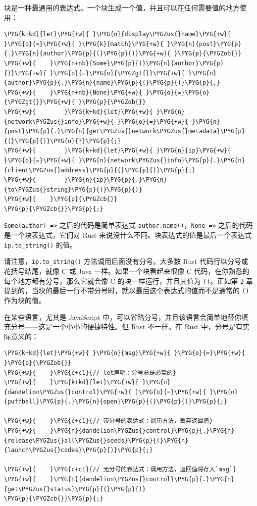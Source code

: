 块是一种最通用的表达式。一个块生成一个值，并且可以在任何需要值的地方使用：

\begin{Verbatim}[commandchars=\\\{\},breaklines=true,breakanywhere=true,fontsize=\codefont,xleftmargin=17bp]
\PYG{k+kd}{let}\PYG{+w}{ }\PYG{n}{display\PYGZus{}name}\PYG{+w}{ }\PYG{o}{=}\PYG{+w}{ }\PYG{k}{match}\PYG{+w}{ }\PYG{n}{post}\PYG{p}{.}\PYG{n}{author}\PYG{p}{(}\PYG{p}{)}\PYG{+w}{ }\PYG{p}{\PYGZob{}}
\PYG{+w}{    }\PYG{n+nb}{Some}\PYG{p}{(}\PYG{n}{author}\PYG{p}{)}\PYG{+w}{ }\PYG{o}{=}\PYG{o}{\PYGZgt{}}\PYG{+w}{ }\PYG{n}{author}\PYG{p}{.}\PYG{n}{name}\PYG{p}{(}\PYG{p}{)}\PYG{p}{,}
\PYG{+w}{    }\PYG{n+nb}{None}\PYG{+w}{ }\PYG{o}{=}\PYG{o}{\PYGZgt{}}\PYG{+w}{ }\PYG{p}{\PYGZob{}}
\PYG{+w}{        }\PYG{k+kd}{let}\PYG{+w}{ }\PYG{n}{network\PYGZus{}info}\PYG{+w}{ }\PYG{o}{=}\PYG{+w}{ }\PYG{n}{post}\PYG{p}{.}\PYG{n}{get\PYGZus{}network\PYGZus{}metadata}\PYG{p}{(}\PYG{p}{)}\PYG{o}{?}\PYG{p}{;}
\PYG{+w}{        }\PYG{k+kd}{let}\PYG{+w}{ }\PYG{n}{ip}\PYG{+w}{ }\PYG{o}{=}\PYG{+w}{ }\PYG{n}{network\PYGZus{}info}\PYG{p}{.}\PYG{n}{client\PYGZus{}address}\PYG{p}{(}\PYG{p}{)}\PYG{p}{;}
\PYG{+w}{        }\PYG{n}{ip}\PYG{p}{.}\PYG{n}{to\PYGZus{}string}\PYG{p}{(}\PYG{p}{)}
\PYG{+w}{    }\PYG{p}{\PYGZcb{}}
\PYG{p}{\PYGZcb{}}\PYG{p}{;}
\end{Verbatim}

\texttt{Some(author) =>} 之后的代码是简单表达式 \texttt{author.name()}，\texttt{None =>} 之后的代码是一个块表达式，它们对 Rust 来说没什么不同。块表达式的值是最后一个表达式 \texttt{ip.to\_string()} 的值。

请注意，\texttt{ip.to\_string()} 方法调用后面没有分号。大多数 Rust 代码行以分号或花括号结尾，就像 C 或 Java 一样。如果一个块看起来很像 C 代码，在你熟悉的每个地方都有分号，那么它就会像 C 的块一样运行，并且其值为 \texttt{()}。正如第 2 章提到的，当块的最后一行不带分号时，就以最后这个表达式的值而不是通常的 \texttt{()} 作为块的值。

在某些语言，尤其是 JavaScript 中，可以省略分号，并且该语言会简单地替你填充分号——这是一个小小的便捷特性。但 Rust 不一样。在 Rust 中，分号是有实际意义的：

\begin{Verbatim}[commandchars=\\\{\},breaklines=true,breakanywhere=true,fontsize=\codefont,xleftmargin=17bp]
\PYG{k+kd}{let}\PYG{+w}{ }\PYG{n}{msg}\PYG{+w}{ }\PYG{o}{=}\PYG{+w}{ }\PYG{p}{\PYGZob{}}
\PYG{+w}{    }\PYG{c+c1}{// let声明：分号总是必需的}
\PYG{+w}{    }\PYG{k+kd}{let}\PYG{+w}{ }\PYG{n}{dandelion\PYGZus{}control}\PYG{+w}{ }\PYG{o}{=}\PYG{+w}{ }\PYG{n}{puffball}\PYG{p}{.}\PYG{n}{open}\PYG{p}{(}\PYG{p}{)}\PYG{p}{;}

\PYG{+w}{    }\PYG{c+c1}{// 带分号的表达式：调用方法，丢弃返回值}
\PYG{+w}{    }\PYG{n}{dandelion\PYGZus{}control}\PYG{p}{.}\PYG{n}{release\PYGZus{}all\PYGZus{}seeds}\PYG{p}{(}\PYG{n}{launch\PYGZus{}codes}\PYG{p}{)}\PYG{p}{;}

\PYG{+w}{    }\PYG{c+c1}{// 无分号的表达式：调用方法，返回值将存入`msg`}
\PYG{+w}{    }\PYG{n}{dandelion\PYGZus{}control}\PYG{p}{.}\PYG{n}{get\PYGZus{}status}\PYG{p}{(}\PYG{p}{)}
\PYG{p}{\PYGZcb{}}\PYG{p}{;}
\end{Verbatim}

